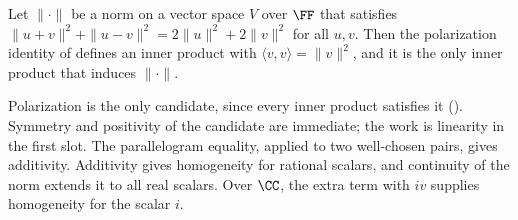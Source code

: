 \documentclass[10pt]{scrartcl}
\newcommand{\ip}[2]{\langle #1,#2\rangle}
\begin{document}
\begin{theorem*}
  Let $\|\cdot\|$ be a norm on a vector space $V$ over $\FF$ that satisfies $\|u+v\|^2+\|u-v\|^2=2\|u\|^2+2\|v\|^2$ for all $u,v$. Then the polarization identity of  defines an inner product with $\ip vv=\|v\|^2$, and it is the only inner product that induces $\|\cdot\|$.
\end{theorem*}
\begin{ideabox}
Polarization is the only candidate, since every inner product satisfies it (). Symmetry and positivity of the candidate are immediate; the work is linearity in the first slot. The parallelogram equality, applied to two well-chosen pairs, gives additivity. Additivity gives homogeneity for rational scalars, and continuity of the norm extends it to all real scalars. Over $\CC$, the extra term with $iv$ supplies homogeneity for the scalar $i$.
\end{ideabox}
\end{document}
